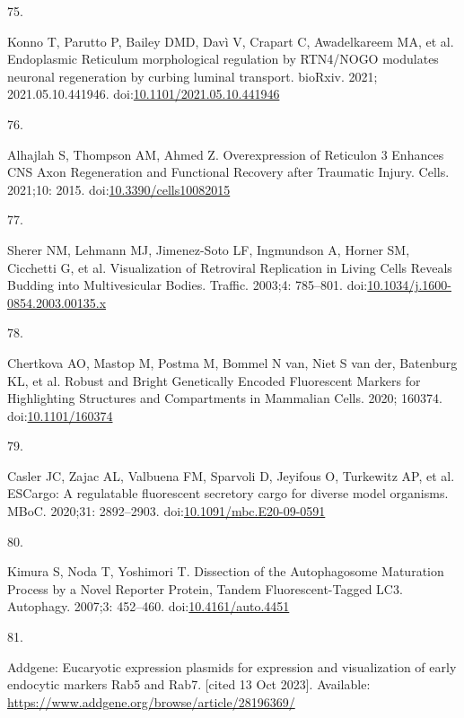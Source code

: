 \documentclass[
  12pt,
  a4paper,
]{book}
\newlength{\cslhangindent}
\newlength{\csllabelwidth}
\newenvironment{CSLReferences}[2] %
 {\begin{list}{}{%
  \setlength{\itemindent}{0pt}
  \setlength{\leftmargin}{0pt}
  \setlength{\parsep}{0pt}
  \ifodd #1
   \setlength{\leftmargin}{\cslhangindent}
   \setlength{\itemindent}{-1\cslhangindent}
  \fi
  \setlength{\itemsep}{#2\baselineskip}}}
 {\end{list}}
\newcommand{\CSLLeftMargin}[1]{\parbox[t]{\csllabelwidth}{\strut#1\strut}}
\newcommand{\CSLRightInline}[1]{\parbox[t]{\linewidth - \csllabelwidth}{\strut#1\strut}}
\begin{document}
\begin{CSLReferences}{0}{1}
\CSLLeftMargin{75. }%
\CSLRightInline{Konno T, Parutto P, Bailey DMD, Davì V, Crapart C, Awadelkareem MA, et al. Endoplasmic {Reticulum} morphological regulation by {RTN4}/{NOGO} modulates neuronal regeneration by curbing luminal transport. bioRxiv. 2021; 2021.05.10.441946. doi:\href{https://doi.org/10.1101/2021.05.10.441946}{10.1101/2021.05.10.441946}}

\CSLLeftMargin{76. }%
\CSLRightInline{Alhajlah S, Thompson AM, Ahmed Z. Overexpression of {Reticulon} 3 {Enhances CNS Axon Regeneration} and {Functional Recovery} after {Traumatic Injury}. Cells. 2021;10: 2015. doi:\href{https://doi.org/10.3390/cells10082015}{10.3390/cells10082015}}

\CSLLeftMargin{77. }%
\CSLRightInline{Sherer NM, Lehmann MJ, Jimenez-Soto LF, Ingmundson A, Horner SM, Cicchetti G, et al. Visualization of {Retroviral Replication} in {Living Cells Reveals Budding} into {Multivesicular Bodies}. Traffic. 2003;4: 785--801. doi:\href{https://doi.org/10.1034/j.1600-0854.2003.00135.x}{10.1034/j.1600-0854.2003.00135.x}}

\CSLLeftMargin{78. }%
\CSLRightInline{Chertkova AO, Mastop M, Postma M, Bommel N van, Niet S van der, Batenburg KL, et al. Robust and {Bright Genetically Encoded Fluorescent Markers} for {Highlighting Structures} and {Compartments} in {Mammalian Cells}. 2020; 160374. doi:\href{https://doi.org/10.1101/160374}{10.1101/160374}}

\CSLLeftMargin{79. }%
\CSLRightInline{Casler JC, Zajac AL, Valbuena FM, Sparvoli D, Jeyifous O, Turkewitz AP, et al. {ESCargo}: A regulatable fluorescent secretory cargo for diverse model organisms. MBoC. 2020;31: 2892--2903. doi:\href{https://doi.org/10.1091/mbc.E20-09-0591}{10.1091/mbc.E20-09-0591}}

\CSLLeftMargin{80. }%
\CSLRightInline{Kimura S, Noda T, Yoshimori T. Dissection of the {Autophagosome Maturation Process} by a {Novel Reporter Protein}, {Tandem Fluorescent-Tagged LC3}. Autophagy. 2007;3: 452--460. doi:\href{https://doi.org/10.4161/auto.4451}{10.4161/auto.4451}}

\CSLLeftMargin{81. }%
\CSLRightInline{Addgene: {Eucaryotic} expression plasmids for expression and visualization of early endocytic markers {Rab5} and {Rab7}. {[}cited 13 Oct 2023{]}. Available: \url{https://www.addgene.org/browse/article/28196369/}}


\end{CSLReferences}
\end{document}

